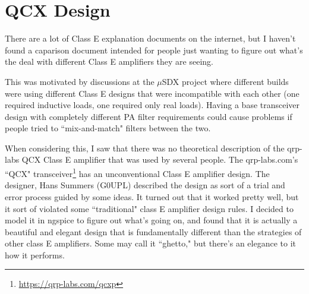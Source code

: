 \documentclass[10pt,letterpaper]{article}
\begin{document}
%
%
%
%
%


\section{QCX Design}\label{qcxdesign}
There are a lot of Class E explanation documents on the internet, but I haven't found a caparison document intended for people just wanting to figure out what's the deal with different Class E amplifiers they are seeing.

This was motivated by discussions at the $\mu$SDX project where different builds were using different Class E designs that were incompatible with each other (one required inductive loads, one required only real loads). Having a base transceiver design with completely different PA filter requirements could cause problems if people tried to ``mix-and-match" filters between the two.

When considering this, I saw that there was no theoretical description of the qrp-labs QCX Class E amplifier that was used by several people. The qrp-labs.com's ``QCX" transceiver\footnote{\url{https://qrp-labs.com/qcxp}} has an unconventional Class E amplifier design. The designer, Hans Summers (G0UPL) described the design as sort of a trial and error process guided by some ideas. It turned out that it worked pretty well, but it sort of violated some ``traditional" class E amplifier design rules. I decided to model it in ngspice to figure out what's going on, and found that it is actually a beautiful and elegant design that is fundamentally different than the strategies of other class E amplifiers. Some may call it ``ghetto," but there's an elegance to it how it performs.
\end{document}
